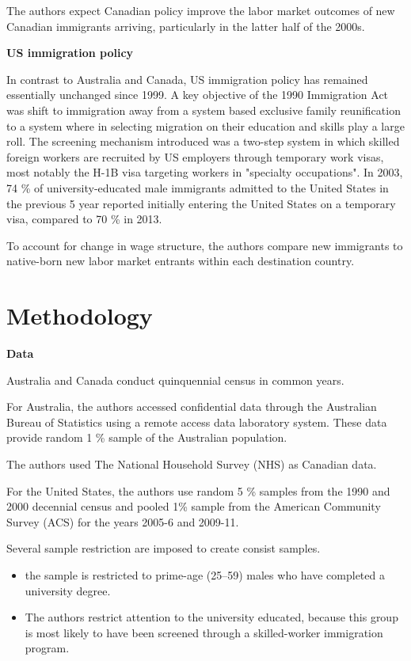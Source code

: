 \documentclass[../root]{subfiles}
\begin{document}
    The authors expect Canadian policy improve the labor market outcomes of new Canadian immigrants arriving, particularly in the latter half of the 2000s.  
     
     {\bf US immigration policy}
     
     In contrast to Australia and Canada, US immigration policy has remained essentially unchanged since 1999. 
     A key objective of the 1990 Immigration Act was shift to immigration away from a system based exclusive family reunification to a system where in selecting migration on their education and skills play a large roll.  The screening mechanism introduced was a two-step system in which skilled foreign workers are recruited by US employers through temporary work visas, most notably the H-1B visa targeting workers in "specialty occupations". 
     In 2003, 74 \% of university-educated male immigrants admitted to the United States in the previous 5 year reported initially entering the United States on a temporary visa, compared to 70 \% in 2013.
     
     To account for change in wage structure, the authors compare new immigrants to native-born new labor market entrants within each destination country.
     
     \section{Methodology}
    
    {\bf Data}
    
    Australia and Canada conduct quinquennial census in common years.
    
    For Australia, the authors accessed confidential data through the Australian Bureau of Statistics using a remote access data laboratory system. These data provide random 1 \% sample of the Australian population.
    
    The authors used The National Household Survey (NHS) as Canadian data.
    
    For the United States, the authors use random 5 \% samples from the 1990 and 2000 decennial census and pooled 1\% sample from the American Community Survey (ACS) for the years 2005-6 and 2009-11.
    
    Several sample restriction are imposed to create consist samples.
    \begin{itemize}
        \item the sample is restricted to prime-age (25–59) males who have completed a university degree.
        \item The authors restrict attention to the university educated, because this group is most likely to have been screened through a skilled-worker immigration program.
    \end{itemize}
    
\end{document}
